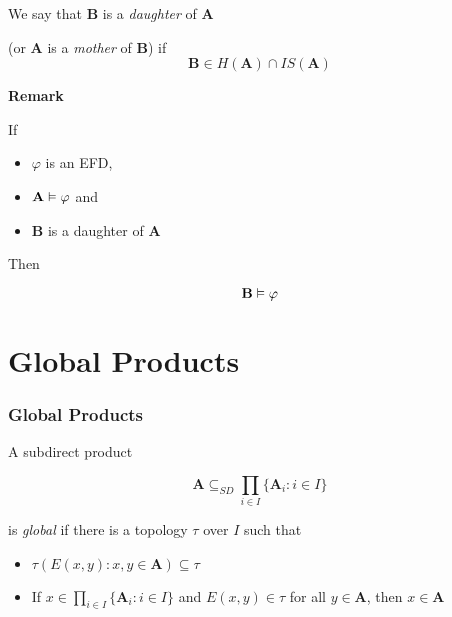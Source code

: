 \documentclass[12pt,handout]{beamer}
\newenvironment{stepitemize}{\begin{itemize}[<+->]}{\end{itemize} }
\begin{document}
\begin{frame}
 \begin{definition}
  We say that $\mathbf{B}$ is a \textit{daughter} of $\mathbf{A}$ 

(or $\mathbf{A}$ is a \textit{mother} of $\mathbf{B}$) if 
\[ \mathbf{B} \in H(\mathbf{A}) \cap IS(\mathbf{A}) \]

 \end{definition}

\textbf{Remark} 

If 

\begin{stepitemize}
 \item $\varphi$ is an EFD,
 \item $\mathbf{A} \vDash \varphi$ and 
 \item $\mathbf{B}$ is a daughter of $\mathbf{A}$
\end{stepitemize}

\pause

Then

\[ \mathbf{B} \vDash \varphi \]




\end{frame}


\section{Global Products}

\begin{frame}
 \frametitle{Global Products}
\begin{Definition}

\pause 
\bigskip

A subdirect product 

\pause

\[ \mathbf{A} \subseteq_{SD} \prod_{i \in I} \{\mathbf{A}_i : i \in I\} \]

\pause

is \textit{global} if there is a topology $\tau$ over $I$ such that

\begin{stepitemize}

 \item $\tau({E(x,y) : x,y \in \mathbf{A}}) \subseteq \tau$

\item If $x \in \prod_{i \in I} \{\mathbf{A}_i : i \in I\}$ and $E(x,y) \in \tau$ for all $y \in \mathbf{A}$, then $x \in \mathbf{A}$

\end{stepitemize}
\end{Definition}
\end{frame}
\end{document}
